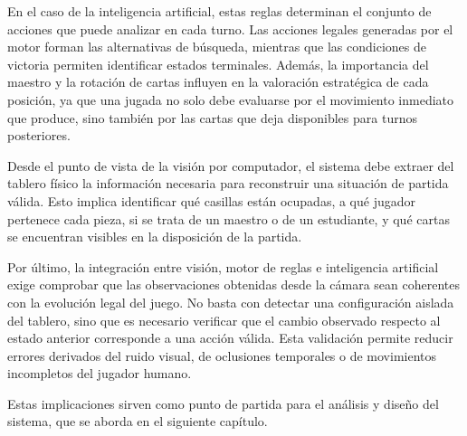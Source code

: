 En el caso de la inteligencia artificial, estas reglas determinan el conjunto de acciones que puede analizar en cada turno. Las acciones legales generadas por el motor forman las alternativas de búsqueda, mientras que las condiciones de victoria permiten identificar estados terminales. Además, la importancia del maestro y la rotación de cartas influyen en la valoración estratégica de cada posición, ya que una jugada no solo debe evaluarse por el movimiento inmediato que produce, sino también por las cartas que deja disponibles para turnos posteriores.

Desde el punto de vista de la visión por computador, el sistema debe extraer del tablero físico la información necesaria para reconstruir una situación de partida válida. Esto implica identificar qué casillas están ocupadas, a qué jugador pertenece cada pieza, si se trata de un maestro o de un estudiante, y qué cartas se encuentran visibles en la disposición de la partida.

Por último, la integración entre visión, motor de reglas e inteligencia artificial exige comprobar que las observaciones obtenidas desde la cámara sean coherentes con la evolución legal del juego. No basta con detectar una configuración aislada del tablero, sino que es necesario verificar que el cambio observado respecto al estado anterior corresponde a una acción válida. Esta validación permite reducir errores derivados del ruido visual, de oclusiones temporales o de movimientos incompletos del jugador humano.

Estas implicaciones sirven como punto de partida para el análisis y diseño del sistema, que se aborda en el siguiente capítulo.
